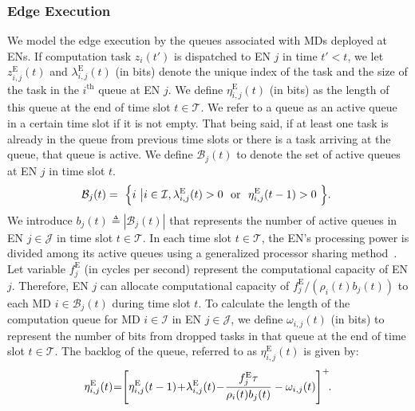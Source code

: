 \documentclass[12pt,draftclsnofoot,onecolumn]{IEEEtran}
\begin{document}
\subsubsection{Edge Execution}
We model the edge execution by the queues associated with MDs deployed at ENs. If computation task $z_i(t')$ is dispatched to EN $j$ in time $t' < t$, we let $z_{i,j}^{\text{E}}(t)$ and $\lambda_{i,j}^{\text{E}}(t)$ (in bits) denote the unique index of the task and the size of the task in the $i^{\text{th}}$ queue at EN $j$. We define $\eta_{i,j}^{\text{E}}(t)$ (in bits) as the length of this queue at the end of time slot $t \in \mathcal{T}$. We refer to a queue as an active queue in a certain time slot if it is not empty. That being said, if at least one task is already in the queue from previous time slots or there is a task arriving at the queue, that queue is active. We define $\mathcal{B}_j(t)$ to denote the set of active queues at EN $j$ in time slot $t$.
\begin{alignat}{1}
	\mathcal{B}_j(t) = \textcolor{white}{i}\Big\{i \textcolor{white}{i}\big| i \in \mathcal{I}, \lambda_{i,j}^{\text{E}}(t)>0\,\, \textcolor{white}{i}\text{or}\textcolor{white}{i} \,\, \eta_{i,j}^{\text{E}}(t-1)>0\textcolor{white}{i}\Big\}.\textcolor{white}{i}
	\label{9}  
\end{alignat}
We introduce $b_j(t) \triangleq |\mathcal{B}_j(t)|$ that represents the number of active queues in EN $j \in \mathcal{J}$ in time slot $t \in \mathcal{T}$. In each time slot $t \in \mathcal{T}$, the EN's processing power is divided among its active queues using a generalized processor sharing method~\cite{parekh1993generalized}. Let variable $f_j^{\text{E}}$ (in cycles per second) represent the computational capacity of EN $j$. Therefore, EN $j$ can allocate computational capacity of $f_j^{\text{E}}/(\rho_i(t) b_j(t))$ to each MD $i \in \mathcal{B}_j(t)$ during time slot $t$. To calculate the length of the computation queue for MD $i \in \mathcal{I}$ in EN $j \in \mathcal{J}$, we define $\omega_{i,j}(t)$ (in bits) to represent the number of bits from dropped tasks in that queue at the end of time slot $t \in \mathcal{T}$. The backlog of the queue, referred to as $\eta_{i,j}^{\text{E}}(t)$ is given by:
\begin{alignat}{1}
	\eta_{i,j}^{\text{E}}(t)\hspace{-0.8mm}=\hspace{-1mm}\left[\eta_{i,j}^{\text{E}}(t-1)\hspace{-0.6mm}+\hspace{-0.7mm}\lambda_{i,j}^{\text{E}}(t)\hspace{-0.7mm}-\hspace{-0.7mm}{f_j^{\text{E}}\tau\over \rho_i(t)b_j(t)} -\omega_{i,j}(t)\right]^+\hspace{-1mm}.
	\label{10}  
\end{alignat}
\end{document}
